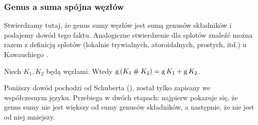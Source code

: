 
\subsubsection{Genus a suma spójna węzłów}

Stwierdzamy tutaj, że genus sumy węzłów jest sumą genusów składników i podajemy dowód tego faktu.
Analogiczne stwierdzenie dla splotów znaleźć można razem z definicją splotów (lokalnie trywialnych, atoroidalnych, prostych, itd.) u Kawauchiego \cite[s. 33-34]{kawauchi1996}.
%
%
%

\begin{proposition}
    \label{prp:genus_of_sum}
    Niech $K_1, K_2$ będą węzłami.
    Wtedy $\operatorname{g} {(K_1 \mathbin{\#} K_2)} = \operatorname{g} K_1 + \operatorname{g} K_2$.
\end{proposition}

Poniższy dowód pochodzi od Schuberta (\cite{schubert1949}), został tylko zapisany we współczesnym języku.
%
Przebiega w dwóch etapach: najpierw pokazuje się, że genus sumy nie jest większy od sumy genusów składników, a następnie, że nie jest od niej mniejszy.

